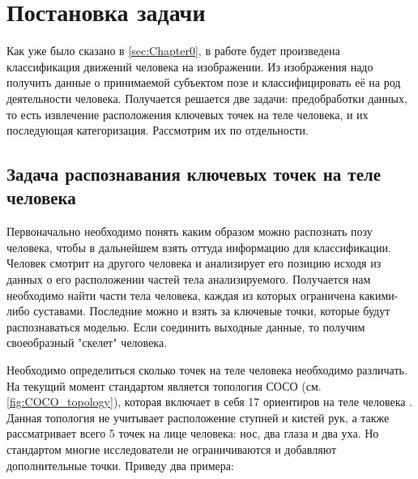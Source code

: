 \section{Постановка задачи}
\label{sec:Chapter1} 

Как уже было сказано в \autoref{sec:Chapter0}, в работе будет произведена классификация движений человека на изображении. Из изображения надо получить данные о принимаемой субъектом позе и классифицировать её на род деятельности человека. Получается решается две задачи: предобработки данных, то есть извлечение расположения ключевых точек на теле человека, и их последующая категоризация. Рассмотрим их по отдельности.


\subsection{Задача распознавания ключевых точек на теле человека}
\label{subsec:Theory of keypoint detection}

Первоначально необходимо понять каким образом можно распознать позу человека, чтобы в дальнейшем взять оттуда информацию для классификации. Человек смотрит на другого человека и анализирует его позицию исходя из данных о его расположении частей тела анализируемого. Получается нам необходимо найти части тела человека, каждая из которых ограничена какими-либо суставами. Последние можно и взять за ключевые точки, которые будут распознаваться моделью. Если соединить выходные данные, то получим своеобразный "скелет"{} человека.

Необходимо определиться сколько точек на теле человека необходимо различать. На текущий момент стандартом является топология СОСО (см. \autoref{fig:COCO_topology}), которая включает в себя 17 ориентиров на теле человека \cite{COCO_topology, COCO_dataset}. Данная топология не учитывает расположение ступней и кистей рук, а также рассматривает всего 5 точек на лице человека: нос, два глаза и два уха. Но стандартом многие исследователи не ограничиваются и добавляют дополнительные точки. Приведу два примера:

